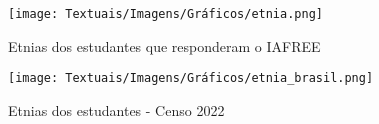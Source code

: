 





\begin{figure}[ht!]
    \centering
    \caption{Etnias dos estudantes que responderam o IAFREE}
    \texttt{[image: Textuais/Imagens/Gráficos/etnia.png]}
    \label{fig:etnia}
\end{figure}

\begin{figure}[ht!]
    \centering
    \caption{Etnias dos estudantes - Censo 2022}
    \texttt{[image: Textuais/Imagens/Gráficos/etnia\_brasil.png]}
    \label{fig:etnia-brasil}
\end{figure}


